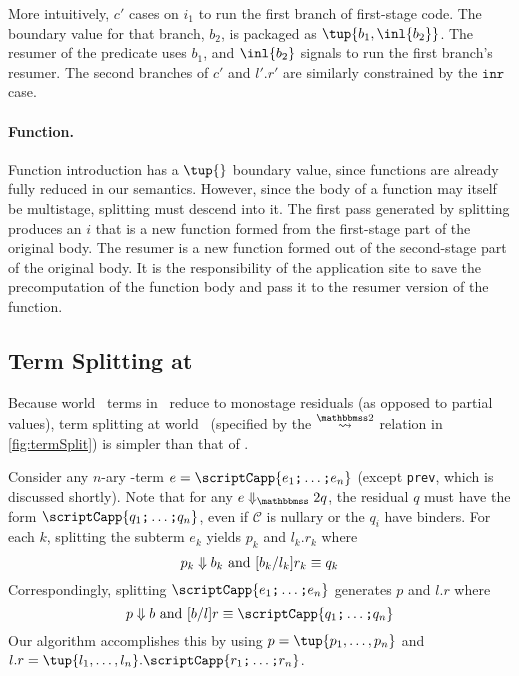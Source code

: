\begin{abstrsyn}
More intuitively, $c'$ cases on $i_1$ to run the first branch of first-stage
code. The boundary value for that branch, $b_2$, is packaged as $\tup {b_1, \inl
{b_2}}$. The resumer of the predicate uses $b_1$, and $\inl{b_2}$ signals to run
the first branch's resumer. The second branches of $c'$ and $l'.r'$ are
similarly constrained by the $\texttt{inr}$ case.


\paragraph {Function.} 
Function introduction has a $\tup{}$ boundary value, since functions
are already fully reduced in our semantics.  However, since the body
of a function may itself be multistage, splitting must descend into
it.  The first pass generated by splitting produces an $i$ that is a new
function formed from the first-stage part of the original body.  The
resumer is a new function formed out of the second-stage part of the
original body.  It is the responsibility of the application site to
save the precomputation of the function body and pass it to the
resumer version of the function.

\subsection{Term Splitting at \bbtwo}

Because world \bbtwo\ terms in \lang\ reduce to monostage residuals
(as opposed to partial values), term splitting at world
\bbtwo\ (specified by the $\splittwosym$ relation in
\cref{fig:termSplit}) is simpler than that of \bbonem.

Consider any $n$-ary \bbtwo-term $e = \scriptCapp {e_1 \ttsemi \ldots
  \ttsemi e_n}$ (except \texttt{prev}, which is discussed shortly).
Note that for any $\diatwo e q$, the residual $q$ must have the form
$\scriptCapp {q_1 \ttsemi \ldots \ttsemi q_n}$, even if $\mathcal{C}$ is
nullary or the $q_i$ have binders.
For each $k$, splitting the subterm $e_k$ yields $p_k$ and $l_k.r_k$ where
\[
	{p_k} \Downarrow {b_k} \text{ and } [{b_k}/{l_k}]{r_k} \equiv {q_k}
\]
Correspondingly, splitting $\scriptCapp {e_1 \ttsemi \ldots \ttsemi e_n}$ generates $p$ and $l.r$ where
\[
	\reduce p b \text{ and } [b/l]r \equiv \scriptCapp {q_1 \ttsemi \ldots \ttsemi q_n}
\]
Our algorithm accomplishes this by using $p = \tup {p_1, \ldots, p_n}$ and
$l.r = \tup {l_1, \ldots, l_n}.\scriptCapp {r_1 \ttsemi \ldots \ttsemi r_n}$.


\end{abstrsyn}
